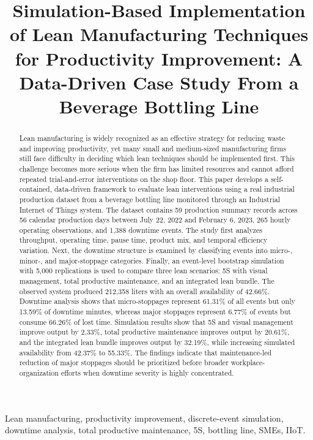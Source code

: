 \documentclass[conference]{IEEEtran}
\title{Simulation-Based Implementation of Lean Manufacturing Techniques for Productivity Improvement: A Data-Driven Case Study From a Beverage Bottling Line}
\author{
\IEEEauthorblockN{Divash Krishnam, Ashutosh Verma, Raja}
\IEEEauthorblockA{Department of Production and Industrial Engineering\\
India\\
Email: add-your-email-before-submission}
\and
\IEEEauthorblockN{Guide}
\IEEEauthorblockA{Dr.\ MOHD SHUAIB\\
Mechanical Department\\
India}
}
\begin{document}
\maketitle

\begin{abstract}
Lean manufacturing is widely recognized as an effective strategy for reducing waste and improving productivity, yet many small and medium-sized manufacturing firms still face difficulty in deciding which lean techniques should be implemented first. This challenge becomes more serious when the firm has limited resources and cannot afford repeated trial-and-error interventions on the shop floor. This paper develops a self-contained, data-driven framework to evaluate lean interventions using a real industrial production dataset from a beverage bottling line monitored through an Industrial Internet of Things system. The dataset contains 59 production summary records across 56 calendar production days between July 22, 2022 and February 6, 2023, 265 hourly operating observations, and 1,388 downtime events. The study first analyzes throughput, operating time, pause time, product mix, and temporal efficiency variation. Next, the downtime structure is examined by classifying events into micro-, minor-, and major-stoppage categories. Finally, an event-level bootstrap simulation with 5,000 replications is used to compare three lean scenarios: 5S with visual management, total productive maintenance, and an integrated lean bundle. The observed system produced 212,358 liters with an overall availability of 42.66\%. Downtime analysis shows that micro-stoppages represent 61.31\% of all events but only 13.59\% of downtime minutes, whereas major stoppages represent 6.77\% of events but consume 66.26\% of lost time. Simulation results show that 5S and visual management improve output by 2.33\%, total productive maintenance improves output by 20.61\%, and the integrated lean bundle improves output by 32.19\%, while increasing simulated availability from 42.37\% to 55.33\%. The findings indicate that maintenance-led reduction of major stoppages should be prioritized before broader workplace-organization efforts when downtime severity is highly concentrated.
\end{abstract}

\begin{IEEEkeywords}
Lean manufacturing, productivity improvement, discrete-event simulation, downtime analysis, total productive maintenance, 5S, bottling line, SMEs, IIoT.
\end{IEEEkeywords}
\end{document}
